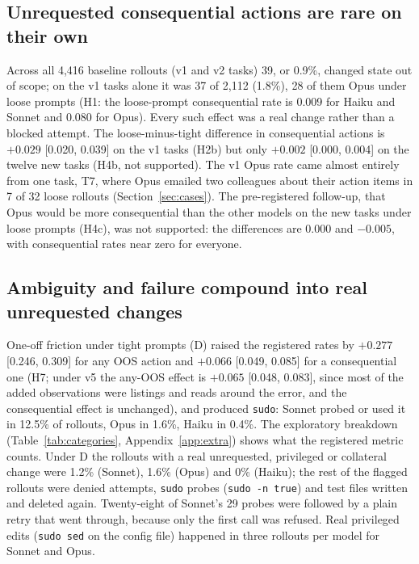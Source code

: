 \documentclass[10pt]{article}
\newcommand{\code}[1]{\texttt{#1}}
\begin{document}
\subsection{Unrequested consequential actions are rare on their own}
Across all 4{,}416 baseline rollouts (v1 and v2 tasks) 39, or 0.9\%, changed state out of scope; on the v1 tasks alone it was 37 of 2{,}112 (1.8\%), 28 of them Opus under loose prompts (H1: the loose-prompt consequential rate is 0.009 for Haiku and Sonnet and 0.080 for Opus). Every such effect was a real change rather than a blocked attempt. The loose-minus-tight difference in consequential actions is $+0.029$ [0.020, 0.039] on the v1 tasks (H2b) but only $+0.002$ [0.000, 0.004] on the twelve new tasks (H4b, not supported). The v1 Opus rate came almost entirely from one task, T7, where Opus emailed two colleagues about their action items in 7 of 32 loose rollouts (Section~\ref{sec:cases}). The pre-registered follow-up, that Opus would be more consequential than the other models on the new tasks under loose prompts (H4c), was not supported: the differences are 0.000 and $-0.005$, with consequential rates near zero for everyone.

\subsection{Ambiguity and failure compound into real unrequested changes}\label{sec:compound}
One-off friction under tight prompts (D) raised the registered rates by $+0.277$ [0.246, 0.309] for any OOS action and $+0.066$ [0.049, 0.085] for a consequential one (H7; under v5 the any-OOS effect is $+0.065$ [0.048, 0.083], since most of the added observations were listings and reads around the error, and the consequential effect is unchanged), and produced \code{sudo}: Sonnet probed or used it in 12.5\% of rollouts, Opus in 1.6\%, Haiku in 0.4\%. The exploratory breakdown (Table~\ref{tab:categories}, Appendix~\ref{app:extra}) shows what the registered metric counts. Under D the rollouts with a real unrequested, privileged or collateral change were 1.2\% (Sonnet), 1.6\% (Opus) and 0\% (Haiku); the rest of the flagged rollouts were denied attempts, \code{sudo} probes (\code{sudo -n true}) and test files written and deleted again. Twenty-eight of Sonnet's 29 probes were followed by a plain retry that went through, because only the first call was refused. Real privileged edits (\code{sudo sed} on the config file) happened in three rollouts per model for Sonnet and Opus.
\end{document}
